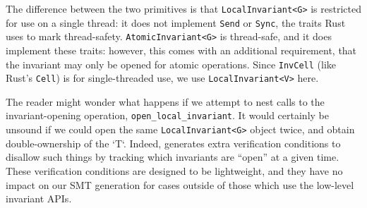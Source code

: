 The difference between the two primitives is that \verb`LocalInvariant<G>` is restricted for use
on a single thread: it does not implement \verb`Send` or \verb`Sync`, the traits Rust uses to mark thread-safety.
\verb`AtomicInvariant<G>` is thread-safe, and it does implement these traits: however,
this comes with an additional requirement, that the invariant may only be opened
for atomic operations.
Since \verb`InvCell` (like Rust's \verb`Cell`) is for single-threaded use,
we use \verb`LocalInvariant<V>` here. 

The reader might wonder what happens if we attempt to nest calls to the invariant-opening
operation, \verb`open_local_invariant`. It would certainly be unsound if we could open the same
\verb`LocalInvariant<G>` object twice, and obtain double-ownership of the `T`.
Indeed, \verus generates extra verification conditions to disallow such things
by tracking which invariants are ``open'' at a given time. These verification conditions
are designed to be lightweight, and they have no impact on our SMT generation
for cases outside of those which use the low-level invariant APIs.
